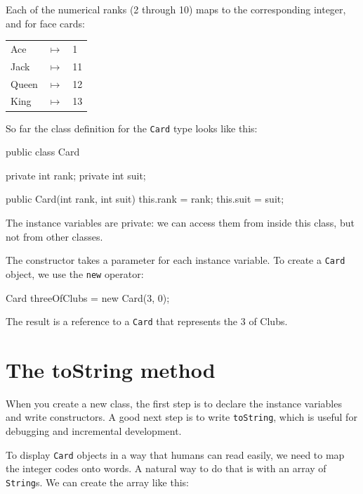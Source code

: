 \documentclass[12pt]{book}
\theoremstyle{exercise}
\newcommand{\java}[1]{\verb"#1"}
\begin{document}
Each of the numerical ranks (2 through 10) maps to the corresponding integer, and for face cards:

\begin{tabular}{l c l}
Ace & $\mapsto$ & 1 \\
Jack & $\mapsto$ & 11 \\
Queen & $\mapsto$ & 12 \\
King & $\mapsto$ & 13 \\
\end{tabular}

So far the class definition for the \java{Card} type looks like this:

\begin{code}
public class Card {
    private int rank;
    private int suit;

    public Card(int rank, int suit) {
        this.rank = rank;
        this.suit = suit;
    }
}
\end{code}


The instance variables are private: we can access them from inside this class, but not from other classes.

The constructor takes a parameter for each instance variable.
To create a \java{Card} object, we use the \java{new} operator:

\begin{code}
    Card threeOfClubs = new Card(3, 0);
\end{code}

The result is a reference to a \java{Card} that represents the 3 of Clubs.


\section{The toString method}
\label{printcard}


When you create a new class, the first step is to declare the instance variables and write constructors.
A good next step is to write \java{toString}, which is useful for debugging and incremental development.


To display \java{Card} objects in a way that humans can read easily, we need to map the integer codes onto words.
A natural way to do that is with an array of \java{String}s.
We can create the array like this:
\end{document}
